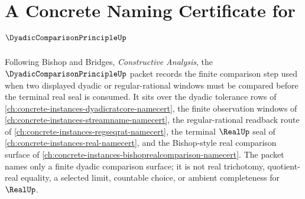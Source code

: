 \chapter{A Concrete Naming Certificate for $\DyadicComparisonPrincipleUp$}
\label{ch:concrete-instances-dyadic-comparison-principle-namecert}

Following Bishop and Bridges, \emph{Constructive Analysis}, the $\DyadicComparisonPrincipleUp$ packet records the finite comparison step used when two displayed dyadic or regular-rational windows must be compared before the terminal real seal is consumed. It sits over the dyadic tolerance rows of \autoref{ch:concrete-instances-dyadicratcore-namecert}, the finite observation windows of \autoref{ch:concrete-instances-streamname-namecert}, the regular-rational readback route of \autoref{ch:concrete-instances-regseqrat-namecert}, the terminal $\RealUp$ seal of \autoref{ch:concrete-instances-real-namecert}, and the Bishop-style real comparison surface of \autoref{ch:concrete-instances-bishoprealcomparison-namecert}. The packet names only a finite dyadic comparison surface; it is not real trichotomy, quotient-real equality, a selected limit, countable choice, or ambient completeness for $\RealUp$.

